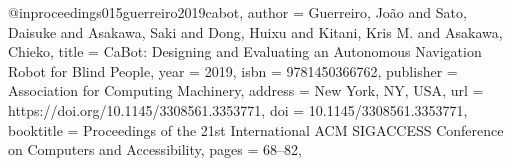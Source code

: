 @inproceedings{015guerreiro2019cabot,
author = {Guerreiro, Jo\~{a}o and Sato, Daisuke and Asakawa, Saki and Dong, Huixu and Kitani, Kris M. and Asakawa, Chieko},
title = {CaBot: Designing and Evaluating an Autonomous Navigation Robot for Blind People},
year = {2019},
isbn = {9781450366762},
publisher = {Association for Computing Machinery},
address = {New York, NY, USA},
url = {https://doi.org/10.1145/3308561.3353771},
doi = {10.1145/3308561.3353771},
booktitle = {Proceedings of the 21st International ACM SIGACCESS Conference on Computers and Accessibility},
pages = {68–82},
}